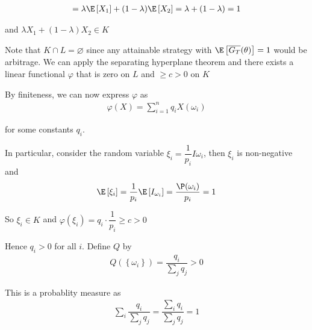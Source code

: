 \begin{prf}[]{}
\begin{equation*}
\begin{gathered}
        =\lambda\E\left[X_1\right]+(1-\lambda)\E\left[X_2\right]=\lambda+(1-\lambda) = 1
      \end{gathered}
    \end{equation*}\par
    \noindent and $\lambda X_1+(1-\lambda)X_2\in K$
    \par\bigskip
    \noindent Note that $K\cap L = \varnothing$ since any attainable strategy with $\E\left[\overline{G_T}(\theta)\right] = 1$ would be arbitrage. We can apply the separating hyperplane theorem and there exists a linear functional $\varphi$ that is zero on $L$ and $\geq c>0$ on $K$\par
    \noindent By finiteness, we can now express $\varphi$ as
    \begin{equation*}
      \begin{gathered}
        \varphi(X) = \sum_{i=1}^{n}q_i X(\omega_i)
      \end{gathered}
    \end{equation*}\par
    \noindent for some constants $q_i$.\par
    \noindent In particular, consider the random variable $\xi_i =\dfrac{1}{p_i}I{\omega_i}$, then $\xi_i$ is non-negative and 
    \begin{equation*}
      \begin{gathered}
        \E\left[\xi_i\right] = \dfrac{1}{p_i}\E\left[I_{\omega_i}\right] = \dfrac{\P(\omega_i)}{p_i} = 1
      \end{gathered}
    \end{equation*}\par
    \noindent So $\xi_i \in K$ and $\varphi(\xi_i) = q_i\cdot\dfrac{1}{p_i}\geq c>0$
    \par\bigskip
    \noindent Hence $q_i>0$ for all $i$. Define $Q$ by 
    \begin{equation*}
      \begin{gathered}
        Q(\left\{\omega_i\right\}) = \dfrac{q_i}{\sum_j q_j}>0
      \end{gathered}
    \end{equation*}
    \par\bigskip
    \noindent This is a probablity measure as 
    \begin{equation*}
      \begin{gathered}
        \sum_i\dfrac{q_i}{\sum_j q_j} = \dfrac{\sum_i q_i}{\sum_j q_j} = 1
      \end{gathered}
    \end{equation*}

\end{prf}
